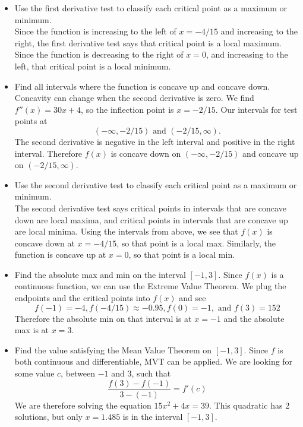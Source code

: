 \documentclass{exam}
\begin{document}
\begin{enumerate}
\begin{itemize}
\item Use the first derivative test to classify each critical point as a maximum or minimum.\\
Since the function is increasing to the left of $x=-4/15$ and increasing to the right, the first derivative test says that critical point is a local maximum. Since the function is decreasing to the right of $x = 0$, and increasing to the left, that critical point is a local minimum.
\item Find all intervals where the function is concave up and concave down.\\
Concavity can change when the second derivative is zero. We find $f''(x) = 30x+4$, so the inflection point is $x = -2/15$. Our intervals for test points at $$(-\infty, -2/15) \mbox{ and } (-2/15, \infty).$$ The second derivative is negative in the left interval and positive in the right interval. Therefore $f(x)$ is concave down on $(-\infty, -2/15)$ and concave up on $(-2/15, \infty)$.
\item Use the second derivative test to classify each critical point as a maximum or minimum.\\
The second derivative test says critical points in intervals that are concave down are local maxima, and critical points in intervals that are concave up are local minima. Using the intervals from above, we see that $f(x)$ is concave down at $x = -4/15$, so that point is a local max. Similarly, the function is concave up at $x = 0$, so that point is a local min.
\item Find the absolute max and min on the interval $[-1,3]$.
Since $f(x)$ is a continuous function, we can use the Extreme Value Theorem. We plug the endpoints and the critical points into $f(x)$ and see $$f(-1) = -4, f(-4/15) \approx -0.95, f(0) = -1, \mbox{ and } f(3) = 152$$ Therefore the absolute min on that interval is at $x= -1$ and the absolute max is at $x = 3$.
\item Find the value satisfying the Mean Value Theorem on $[-1,3]$.
Since $f$ is both continuous and differentiable, MVT can be applied. We are looking for some value $c$, between $-1$ and $3$, such that $$\frac{f(3) - f(-1)}{3 - (-1)} = f'(c)$$
We are therefore solving the equation $15x^2 + 4x = 39$. This quadratic has 2 solutions, but only $x = 1.485$ is in the interval $[-1,3]$.
\end{itemize}


\end{enumerate}
\end{document}
